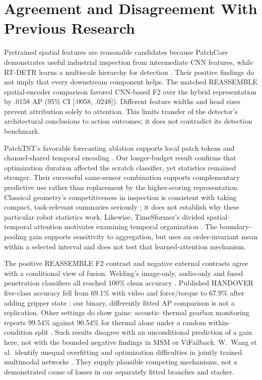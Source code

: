 \section{Agreement and Disagreement With Previous Research}
Pretrained spatial features are reasonable candidates because PatchCore demonstrates
useful industrial inspection from intermediate CNN features, while RT-DETR learns a
multiscale hierarchy for detection \citep{Roth2022Towards,Zhao2024RTDETR}. Their
positive findings do not imply that every downstream component helps. The matched
REASSEMBLE spatial-encoder comparison favored CNN-based F2 over the hybrid
representation by .0158 AP (95\% CI [.0058, .0248]). Different feature widths and head
sizes prevent attribution solely to attention. This limits transfer of the detector's
architectural conclusions to action outcomes; it does not contradict its detection
benchmark.

PatchTST's favorable forecasting ablation supports local patch tokens and channel-shared
temporal encoding \citep{Nie2023PatchTST}. Our longer-budget result confirms that
optimization duration affected the scratch classifier, yet statistics remained stronger.
Their successful same-sensor combination supports complementary predictive use rather
than replacement by the higher-scoring representation. Classical geometry's
competitiveness in inspection is consistent with taking compact, task-relevant summaries
seriously \citep{Horwitz2023Back}; it does not establish why these particular robot
statistics work. Likewise, TimeSformer's divided spatial--temporal attention motivates
examining temporal organization \citep{P034}. The boundary-pooling gain supports
sensitivity to aggregation, but uses an order-invariant mean within a selected interval
and does not test that learned-attention mechanism.

The positive REASSEMBLE F2 contrast and negative external contrasts agree with a
conditional view of fusion. Welding's image-only, audio-only and fused penetration
classifiers all reached 100\% clean accuracy \citep[Tables~1--3]{Hua2026Weld}. Published
HANDOVER five-class accuracy fell from 69.1\% with video and force/torque to 67.9\%
after adding gripper state \citep[Table~III]{Thoduka2024Handover}; our binary,
differently fitted AP comparison is not a replication. Other settings do show gains:
acoustic--thermal gearbox monitoring reports 99.54\% against 90.54\% for thermal alone
under a random within-condition split \citep[Table~2]{Ying2025Trustworthy}. Such results
disagree with an unconditional prediction of a gain here, not with the bounded negative
findings in MSM or ViFailback. W.~Wang et al.\ identify unequal overfitting and
optimization difficulties in jointly trained multimodal networks \citep{Wang2020What}.
They supply plausible competing mechanisms, not a demonstrated cause of losses in our
separately fitted branches and stacker.

